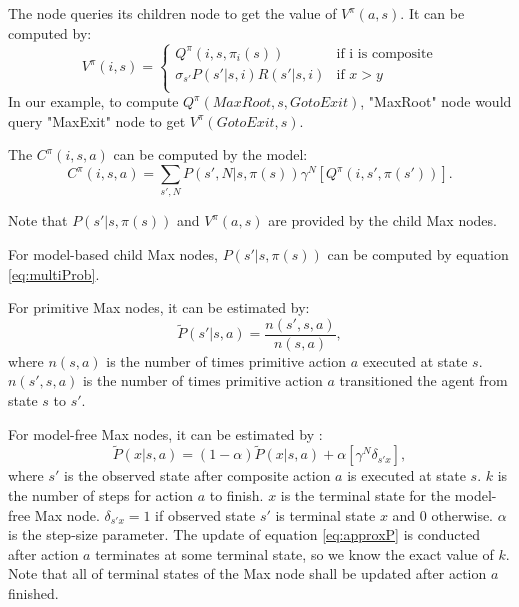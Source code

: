 \documentclass{article} %
\begin{document}
The node queries its children node to get the value of $V^{\pi}(a, s)$.
It can be computed by:
\begin{equation}
    V^{\pi}(i, s) = \left\{\begin{array}{ll}
                    Q^{\pi}(i, s, \pi_i(s)) & \mbox{if i is composite} \\
                    \sigma_{s'} P(s'|s, i)R(s'|s, i) & \mbox{if $x>y$} \\  
                    \end{array} \right.
    \label{eq:V}
\end{equation}
In our example, to compute $Q^{\pi}(MaxRoot, s, GotoExit)$, "MaxRoot" node would query 
"MaxExit" node to get $V^{\pi}(GotoExit, s)$.

The $C^{\pi}(i, s, a)$ can be computed by the model:
\begin{equation}
    C^{\pi}(i, s, a) = \sum_{s', N}P(s', N|s, \pi(s))\gamma^N[Q^{\pi}(i, s', \pi(s'))].
    \label{eq:C}
\end{equation}

Note that $P(s'|s, \pi(s))$ and $V^{\pi}(a, s)$ are provided by the child Max nodes.

For model-based child Max nodes, $P(s'|s, \pi(s))$ can be computed by equation \ref{eq:multiProb}.

For primitive Max nodes, it can be estimated by:
\begin{equation}
    \tilde{P}(s'|s, a)  = \frac{n(s', s, a)}{n(s, a)},
    \label{eq:countP}
\end{equation}
where $n(s, a)$ is the number of times primitive action $a$ executed 
at state $s$. $n(s', s, a)$ is the number of times primitive action $a$
transitioned the agent from state $s$ to $s'$.

For model-free Max nodes, it can be estimated by \cite{option}:
\begin{equation}
    \tilde{P}(x|s, a) = (1-\alpha)\tilde{P}(x|s, a) + \alpha [ \gamma^N \delta_{s'x}],
    \label{eq:approxP}
\end{equation}
where $s'$ is the observed state after composite action $a$ is executed at state $s$.
$k$ is the number of steps for action $a$ to finish. 
$x$ is the terminal state for the model-free Max node. $\delta_{s'x}=1$ if observed state $s'$
is terminal state $x$ and 0 otherwise.
$\alpha$ is the step-size parameter.
The update of equation \ref{eq:approxP} is conducted after action $a$ terminates at some terminal state,
so we know the exact value of $k$. Note that all of terminal states of the Max node shall be updated after 
action $a$ finished.
\end{document}

